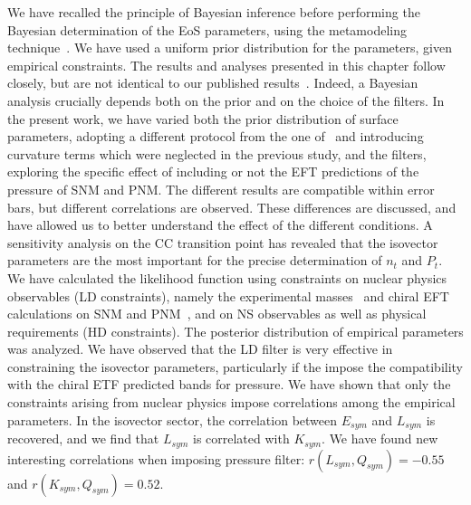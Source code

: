 We have recalled the principle of Bayesian inference before performing the
Bayesian determination of the EoS parameters, using the metamodeling
technique~\cite{Margueron2018a}. We have used a uniform prior distribution for
the parameters, given empirical constraints. 
%
The results and analyses presented in this chapter follow closely, but are not
identical to our published results~\cite{Carreau2019cc,Carreau2019moi}. Indeed,
a Bayesian analysis crucially depends both on the prior and on the choice of
the filters. In the present work, we have varied both the prior distribution of
surface parameters, adopting a different protocol from the one
of~\cite{Carreau2019cc,Carreau2019moi} and introducing curvature terms which
were neglected in the previous study, and the filters, exploring the specific
effect of including or not the EFT predictions of the pressure of SNM and PNM.
The different results are compatible within error bars, but different
correlations are observed. These differences are discussed, and have allowed us
to better understand the effect of the different conditions.
%
A sensitivity analysis on the CC
transition point has revealed that the isovector parameters are 
the most important for the precise determination of $n_t$ and $P_t$.
We have calculated the likelihood function using constraints on nuclear physics
observables (LD constraints), namely the experimental masses~\cite{Huang2017} 
and chiral EFT calculations on SNM and PNM~\cite{Drischler2016}, and on NS
observables as well as physical requirements (HD constraints). The posterior
distribution of empirical parameters was analyzed. We have observed that the
LD filter is very effective in constraining the isovector parameters,
particularly if the impose the compatibility with the chiral ETF predicted
bands for pressure. We have shown that only the constraints arising from
nuclear physics impose correlations among the empirical parameters. In the
isovector sector, the correlation between $E_{sym}$ and $L_{sym}$ is recovered,
and we find that $L_{sym}$ is correlated with $K_{sym}$. We have found
new interesting correlations when imposing pressure filter:
$r(L_{sym},Q_{sym})=-0.55$ and $r(K_{sym},Q_{sym})=0.52$.

